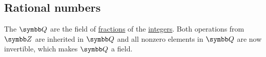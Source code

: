 \subsection{Rational numbers}\label{subsec:rational_numbers}

\begin{Definition}\label{def:rational_numbers}
  The  \( \BQ \) are the field of \hyperref[def:field_of_fractions]{fractions} of the \hyperref[def:integers]{integers}. Both operations from \( \BZ \) are inherited in \( \BQ \) and all nonzero elements in \( \BQ \) are now invertible, which makes \( \BQ \) a field.
\end{Definition}
